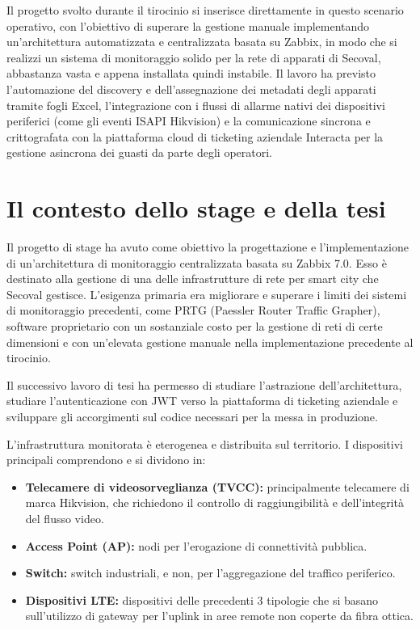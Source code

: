 \documentclass[12pt, a4paper, oneside]{report}
\begin{document}
Il progetto svolto durante il tirocinio si inserisce direttamente in questo scenario operativo, con l'obiettivo di superare la gestione manuale implementando un'architettura automatizzata e centralizzata basata su Zabbix, in modo che si realizzi un sistema di monitoraggio solido per la rete di apparati di Secoval, abbastanza vasta e appena installata quindi instabile.
Il lavoro ha previsto l'automazione del discovery e dell'assegnazione dei metadati degli apparati tramite fogli Excel, l'integrazione con i flussi di allarme nativi dei dispositivi periferici (come gli eventi ISAPI Hikvision) e la comunicazione sincrona e crittografata con la piattaforma cloud di ticketing aziendale Interacta per la gestione asincrona dei guasti da parte degli operatori.

\section{Il contesto dello stage e della tesi}
Il progetto di stage ha avuto come obiettivo la progettazione e l'implementazione di un'architettura di monitoraggio centralizzata basata su Zabbix 7.0. Esso è destinato alla gestione di una delle infrastrutture di rete per smart city che Secoval gestisce. L'esigenza primaria era migliorare e superare i limiti dei sistemi di monitoraggio precedenti, come PRTG (Paessler Router Traffic Grapher), software proprietario con un sostanziale costo per la gestione di reti di certe dimensioni \parencite{PaesslerPricing} e con un'elevata gestione manuale nella implementazione precedente al tirocinio.

Il successivo lavoro di tesi ha permesso di studiare l'astrazione dell'architettura, studiare l'autenticazione con JWT verso la piattaforma di ticketing aziendale e sviluppare gli accorgimenti sul codice necessari per la messa in produzione.

L'infrastruttura monitorata è eterogenea e distribuita sul territorio. I dispositivi principali comprendono e si dividono in:
\begin{itemize}
    \item \textbf{Telecamere di videosorveglianza (TVCC):} principalmente telecamere di marca Hikvision, che richiedono il controllo di raggiungibilità e dell'integrità del flusso video.
    \item \textbf{Access Point (AP):} nodi per l'erogazione di connettività pubblica.
    \item \textbf{Switch:} switch industriali, e non, per l'aggregazione del traffico periferico.
    \item \textbf{Dispositivi LTE:} dispositivi delle precedenti 3 tipologie che si basano sull'utilizzo di gateway per l'uplink in aree remote non coperte da fibra ottica.
\end{itemize}
\end{document}
